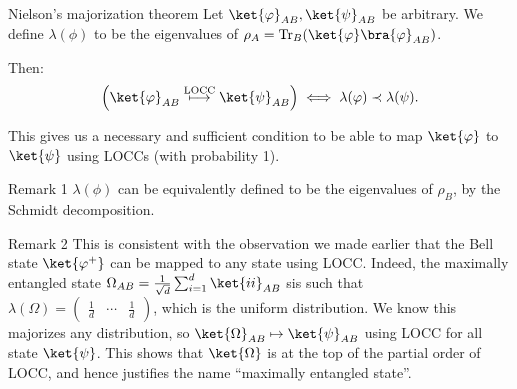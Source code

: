 \documentclass[a4paper]{article}
\begin{document}
\begin{parag}{Nielson's majorization theorem}
    Let $\ket{\phi}_{AB}, \ket{\psi}_{AB}$ be arbitrary. We define $\lambda\left(\phi\right)$ to be the eigenvalues of $\rho_A = \Tr_B\left(\ket{\phi}\bra{\phi}_{AB}\right)$. 

    Then: 
    \[\left(\ket{\phi}_{AB} \over{\longmapsto}{LOCC} \ket{\psi}_{AB}\right) \iff \lambda\left(\phi\right) \prec \lambda\left(\psi\right).\]
    
    This gives us a necessary and sufficient condition to be able to map $\ket{\phi}$ to $\ket{\psi}$ using LOCCs (with probability 1).

    \begin{subparag}{Remark 1}
        $\lambda\left(\phi\right)$ can be equivalently defined to be the eigenvalues of $\rho_B$, by the Schmidt decomposition.
    \end{subparag}

    \begin{subparag}{Remark 2}
        This is consistent with the observation we made earlier that the Bell state $\ket{\phi^+}$ can be mapped to any state using LOCC. Indeed, the maximally entangled state $\Omega_{AB} = \frac{1}{\sqrt{d}} \sum_{i=1}^{d} \ket{ii}_{AB}$ sis such that $\lambda\left(\Omega\right) = \begin{pmatrix} \frac{1}{d} & \cdots & \frac{1}{d} \end{pmatrix} $, which is the uniform distribution. We know this majorizes any distribution, so $\ket{\Omega}_{AB} \mapsto \ket{\psi}_{AB}$ using LOCC for all state $\ket{\psi}$. This shows that $\ket{\Omega}$ is at the top of the partial order of LOCC, and hence justifies the name ``maximally entangled state''.
    \end{subparag}
\end{parag}
\end{document}

